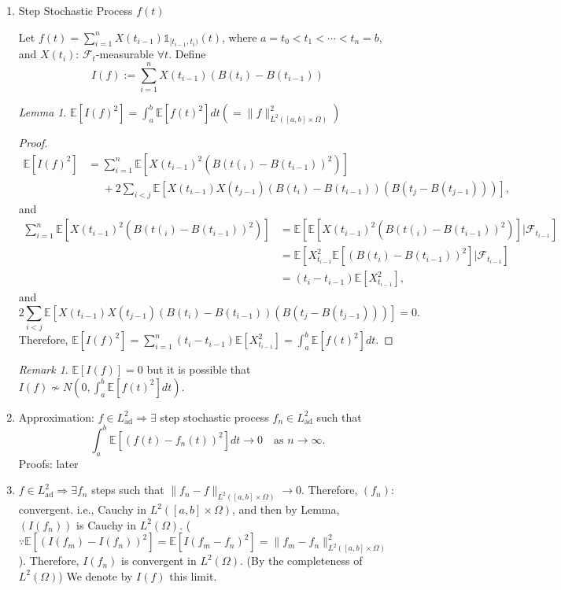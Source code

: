 \documentclass[12pt]{report}
\newcommand{\F}{\mathcal{F}}
\newcommand{\E}{\mathbb{E}}
\renewcommand{\1}{\mathbb{1}}
\theoremstyle{break}
\theoremstyle{newdef}
\theoremstyle{remark}
\newtheorem*{lem}{Lemma}
\newtheorem*{rem}{Remark} %
\begin{document}
\begin{enumerate}[label=\textbf{Step \arabic*)}, wide]
\item Step Stochastic Process $f(t)$

Let $f(t) = \sum_{i=1}^n X(t_{i-1}) \1_{[t_{i-1}, t_i)}(t)$, where $a = t_0 < t_1 < \cdots < t_n = b$, and $X(t_i)$: $\F_t$-measurable $\forall t$.
Define
$$
I(f) := \sum_{i=1}^n X(t_{i-1}) (B(t_i) - B(t_{i-1}))
$$

\begin{lem}
$\E\left[I(f)^2\right] = \int_a^b \E\left[f(t)^2\right] dt (= \|f\|^2_{L^2([a,b]\times\Omega)})$
\begin{proof}
$$
\begin{aligned}
\E\left[I(f)^2\right]
&= \sum_{i=1}^n \E\left[ X(t_{i-1})^2 (B(t(_i) - B(t_{i-1}))^2)\right]\\
&\phantom{=}+ 2\sum_{i < j} \E\left[ X(t_{i-1})X(t_{j-1}) (B(t_i) - B(t_{i-1}))(B(t_{j} - B(t_{j-1}))) \right],
\end{aligned}
$$ and
$$
\begin{aligned}
\sum_{i=1}^n \E\left[ X(t_{i-1})^2 (B(t(_i) - B(t_{i-1}))^2)\right]
&= \E\left[\E\left[ X(t_{i-1})^2 (B(t(_i) - B(t_{i-1}))^2) \right] | \F_{t_{i-1}} \right]\\
&= \E\left[ X_{t_{i-1}}^2 \E\left[ (B(t_i) - B(t_{i-1}))^2 \right] | \F_{t_{i-1}} \right]\\
&= (t_i - t_{i-1}) \E\left[X_{t_{i-1}}^2\right],
\end{aligned}
$$ and
$$
2\sum_{i < j} \E\left[ X(t_{i-1})X(t_{j-1}) (B(t_i) - B(t_{i-1}))(B(t_{j} - B(t_{j-1}))) \right] = 0.
$$
Therefore, $\E\left[I(f)^2\right] = \sum_{i=1}^n (t_i - t_{i-1}) \E\left[X_{t_{i-1}}^2\right] = \int_a^b \E\left[ f(t)^2\right] dt$.
\end{proof}
\end{lem}

\begin{rem}
$\E\left[ I(f) \right] = 0$ but it is possible that $I(f) \not\sim N\left(0, \int_a^b \E\left[ f(t)^2\right] dt \right)$.
\end{rem}

\item Approximation: $f \in L^2_{\text{ad}} \Rightarrow \exists$ step stochastic process $f_n \in L^2_{\text{ad}}$ such that
$$
\int_a^b \E\left[ (f(t) - f_n(t))^2\right]dt \rightarrow 0 \quad \text{as } n\rightarrow\infty.
$$
Proofs: later

\item $f\in L^2_{\text{ad}} \Rightarrow \exists f_n$ steps such that $\|f_n - f\|_{L^2([a,b]\times\Omega)} \rightarrow 0.$
Therefore, $(f_n)$: convergent. i.e., Cauchy in $L^2([a,b] \times \Omega)$, and then by Lemma, $(I(f_n))$ is Cauchy in $L^2(\Omega)$.
($\because \E\left[ (I(f_m) - I(f_n))^2 \right] = \E\left[ I(f_m - f_n)^2 \right] = \|f_m - f_n\|^2_{L^2([a,b]\times\Omega)}$).
Therefore, $I(f_n)$ is convergent in $L^2(\Omega)$. (By the completeness of $L^2(\Omega)$)
We denote by $I(f)$ this limit.

\end{enumerate}
\end{document}
